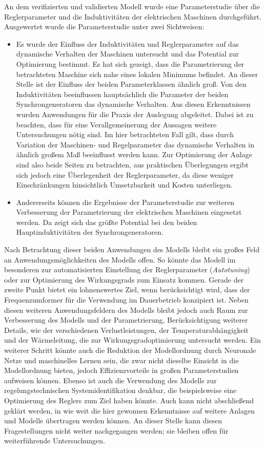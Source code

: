 An dem verifizierten und validierten Modell wurde eine Parameterstudie über die Reglerparameter und die Induktivitäten der elektrischen Maschinen durchgeführt. Ausgewertet wurde die Parameterstudie unter zwei Sichtweisen:\begin{itemize}
	\item Es wurde der Einfluss der Induktivitäten und Reglerparameter auf das dynamische Verhalten der Maschinen untersucht und das Potential zur Optimierung bestimmt. Es hat sich gezeigt, dass die Parametrierung der betrachteten Maschine sich nahe eines lokalen Minimums befindet. An dieser Stelle ist der Einfluss der beiden Parameterklassen ähnlich groß. Von den Induktivitäten beeinflussen hauptsächlich die Parameter der beiden Synchrongeneratoren das dynamische Verhalten. Aus diesen Erkenntnissen wurden Anwendungen für die Praxis der Auslegung abgeleitet. Dabei ist zu beachten, dass für eine Verallgemeinerung der Aussagen weitere Untersuchungen nötig sind. Im hier betrachteten Fall gilt, dass durch Variation der Maschinen- und Regelparameter das dynamische Verhalten in ähnlich großem Maß beeinflusst werden kann. Zur Optimierung der Anlage sind also beide Seiten zu betrachten, aus praktischen Überlegungen ergibt sich jedoch eine Überlegenheit der Reglerparameter, da diese weniger Einschränkungen hinsichtlich Umsetzbarkeit und Kosten unterliegen.
	\item Andererseits können die Ergebnisse der Parameterstudie zur weiteren Verbesserung der Parametrierung der elektrischen Maschinen eingesetzt werden. Da zeigt sich das größte Potential bei den beiden Hauptinduktivitäten der Synchrongeneratoren.
\end{itemize}

Nach Betrachtung dieser beiden Anwendungen des Modells bleibt ein großes Feld an Anwendungsmöglichkeiten des Modells offen. So könnte das Modell im besonderen zur automatisierten Einstellung der Reglerparameter (\emph{Autotuning}) oder zur Optimierung des Wirkungsgrads zum Einsatz kommen. Gerade der zweite Punkt bietet ein lohnenswertes Ziel, wenn berücksichtigt wird, dass der Frequenzumformer für die Verwendung im Dauerbetrieb konzipiert ist. Neben diesen weiteren Anwendungsfeldern des Modells bleibt jedoch auch Raum zur Verbesserung des Modells und der Parametrierung, Berücksichtigung weiterer Details, wie der verschiedenen Verlustleistungen, der Temperaturabhängigkeit und der Wärmeleitung, die zur Wirkungsgradoptimierung untersucht werden. Ein weiterer Schritt könnte auch die Reduktion der Modellordnung durch Neuronale Netze und maschinelles Lernen sein, die zwar nicht dieselbe Einsicht in die Modellordnung bieten, jedoch Effizienzvorteile in großen Parameterstudien aufweisen können. Ebenso ist auch die Verwendung des Modells zur regelungstechnischen Systemidentifikation denkbar, die beispielsweise eine Optimierung des Reglers zum Ziel haben könnte. Auch kann nicht abschließend geklärt werden, in wie weit die hier gewonnen Erkenntnisse auf weitere Anlagen und Modelle übertragen werden können. An dieser Stelle kann diesen Fragestellungen nicht weiter nachgegangen werden; sie bleiben offen für weiterführende Untersuchungen.
